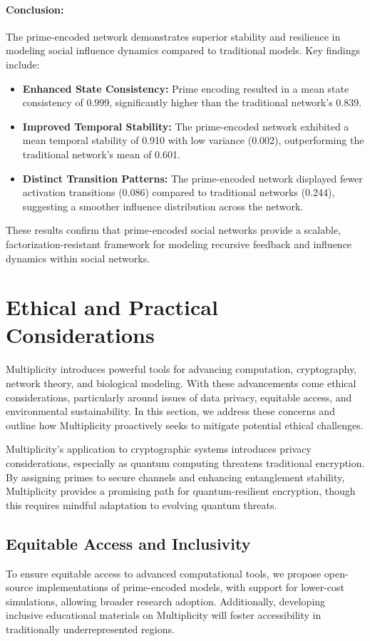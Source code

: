 \documentclass{article}
\theoremstyle{plain}
\begin{document}
\begin{enumerate}
\paragraph{Conclusion:} The prime-encoded network demonstrates superior stability and resilience in modeling social influence dynamics compared to traditional models. Key findings include:
\begin{itemize}
    \item \textbf{Enhanced State Consistency:} Prime encoding resulted in a mean state consistency of 0.999, significantly higher than the traditional network’s 0.839.
    \item \textbf{Improved Temporal Stability:} The prime-encoded network exhibited a mean temporal stability of 0.910 with low variance (0.002), outperforming the traditional network’s mean of 0.601.
    \item \textbf{Distinct Transition Patterns:} The prime-encoded network displayed fewer activation transitions (0.086) compared to traditional networks (0.244), suggesting a smoother influence distribution across the network.
\end{itemize}

These results confirm that prime-encoded social networks provide a scalable, factorization-resistant framework for modeling recursive feedback and influence dynamics within social networks.

\section{Ethical and Practical Considerations}

Multiplicity introduces powerful tools for advancing computation, cryptography, network theory, and biological modeling. With these advancements come ethical considerations, particularly around issues of data privacy, equitable access, and environmental sustainability. In this section, we address these concerns and outline how Multiplicity proactively seeks to mitigate potential ethical challenges.

Multiplicity’s application to cryptographic systems introduces privacy considerations, especially as quantum computing threatens traditional encryption. By assigning primes to secure channels and enhancing entanglement stability, Multiplicity provides a promising path for quantum-resilient encryption, though this requires mindful adaptation to evolving quantum threats.

\subsection{Equitable Access and Inclusivity}
To ensure equitable access to advanced computational tools, we propose open-source implementations of prime-encoded models, with support for lower-cost simulations, allowing broader research adoption. Additionally, developing inclusive educational materials on Multiplicity will foster accessibility in traditionally underrepresented regions.



\end{enumerate}
\end{document}
